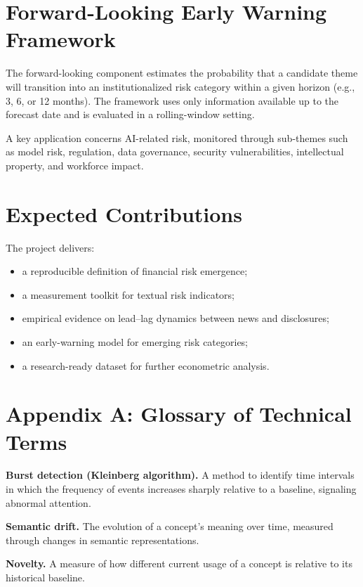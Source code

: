 \documentclass[11pt,a4paper]{article}
\begin{document}
\section{Forward-Looking Early Warning Framework}

The forward-looking component estimates the probability that a candidate theme will transition into an institutionalized risk category within a given horizon (e.g., 3, 6, or 12 months). The framework uses only information available up to the forecast date and is evaluated in a rolling-window setting.

A key application concerns AI-related risk, monitored through sub-themes such as model risk, regulation, data governance, security vulnerabilities, intellectual property, and workforce impact.

\section{Expected Contributions}

The project delivers:
\begin{itemize}
    \item a reproducible definition of financial risk emergence;
    \item a measurement toolkit for textual risk indicators;
    \item empirical evidence on lead--lag dynamics between news and disclosures;
    \item an early-warning model for emerging risk categories;
    \item a research-ready dataset for further econometric analysis.
\end{itemize}

\newpage
\appendix

\section{Appendix A: Glossary of Technical Terms}

\textbf{Burst detection (Kleinberg algorithm).} A method to identify time intervals in which the frequency of events increases sharply relative to a baseline, signaling abnormal attention.

\textbf{Semantic drift.} The evolution of a concept’s meaning over time, measured through changes in semantic representations.

\textbf{Novelty.} A measure of how different current usage of a concept is relative to its historical baseline.
\end{document}
